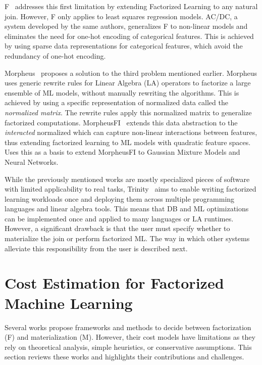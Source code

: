 F~\cite{f_schleich} addresses this first limitation by extending Factorized Learning to any natural join. However, F only applies to least squares regression models. AC/DC, a system developed by the same authors, generalizes F to non-linear models and eliminates the need for one-hot encoding of categorical features. This is achieved by using sparse data representations for categorical features, which avoid the redundancy of one-hot encoding.

Morpheus~\cite{morpheus} proposes a solution to the third problem mentioned earlier. Morpheus uses generic rewrite rules for Linear Algebra (LA) operators to factorize a large ensemble of ML models, without manually rewriting the algorithms. This is achieved by using a specific representation of normalized data called the \textit{normalized matrix}. The rewrite rules apply this normalized matrix to generalize factorized computations. MorpheusFI~\cite{MorpheusFI} extends this data abstraction to the \textit{interacted} normalized which can capture non-linear interactions between features, thus extending factorized learning to ML models with quadratic feature spaces.~\cite{f_gmm_DBLP:conf/icde/ChengKZ021} Uses this as a basis to extend MorpheusFI to Gaussian Mixture Models and Neural Networks.

While the previously mentioned works are mostly specialized pieces of software with limited applicability to real tasks, Trinity~\cite{TrinityPolyglotFrameworkFactorized2021} aims to enable writing factorized learning workloads once and deploying them across multiple programming languages and linear algebra tools. This means that DB and ML optimizations can be implemented once and applied to many languages or LA runtimes. However, a significant drawback is that the user must specify whether to materialize the join or perform factorized ML. The way in which other systems alleviate this responsibility from the user is described next.

\section{Cost Estimation for Factorized Machine Learning}
\label{sec:3-cost-estimation-for-factorized-ml}
Several works propose frameworks and methods to decide between factorization (F) and materialization (M). However, their cost models have limitations as they rely on theoretical analysis, simple heuristics, or conservative assumptions. This section reviews these works and highlights their contributions and challenges.

